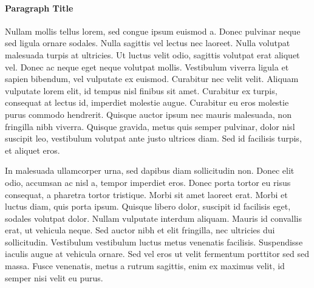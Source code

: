 \paragraph{Paragraph Title} Nullam mollis tellus lorem, sed congue ipsum euismod a.
Donec pulvinar neque sed ligula ornare sodales.
Nulla sagittis vel lectus nec laoreet.
Nulla volutpat malesuada turpis at ultricies.
Ut luctus velit odio, sagittis volutpat erat aliquet vel.
Donec ac neque eget neque volutpat mollis.
Vestibulum viverra ligula et sapien bibendum, vel vulputate ex euismod.
Curabitur nec velit velit.
Aliquam vulputate lorem elit, id tempus nisl finibus sit amet.
Curabitur ex turpis, consequat at lectus id, imperdiet molestie augue.
Curabitur eu eros molestie purus commodo hendrerit.
Quisque auctor ipsum nec mauris malesuada, non fringilla nibh viverra.
Quisque gravida, metus quis semper pulvinar, dolor nisl suscipit leo, vestibulum volutpat ante justo ultrices diam.
Sed id facilisis turpis, et aliquet eros.

In malesuada ullamcorper urna, sed dapibus diam sollicitudin non.
Donec elit odio, accumsan ac nisl a, tempor imperdiet eros.
Donec porta tortor eu risus consequat, a pharetra tortor tristique.
Morbi sit amet laoreet erat.
Morbi et luctus diam, quis porta ipsum.
Quisque libero dolor, suscipit id facilisis eget, sodales volutpat dolor.
Nullam vulputate interdum aliquam.
Mauris id convallis erat, ut vehicula neque.
Sed auctor nibh et elit fringilla, nec ultricies dui sollicitudin.
Vestibulum vestibulum luctus metus venenatis facilisis.
Suspendisse iaculis augue at vehicula ornare.
Sed vel eros ut velit fermentum porttitor sed sed massa.
Fusce venenatis, metus a rutrum sagittis, enim ex maximus velit, id semper nisi velit eu purus.

